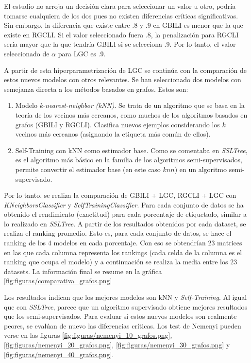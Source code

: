 El estudio no arroja un decisión clara  para seleccionar un valor u otro, podría tomarse cualquiera de los dos pues no existen diferencias críticas significativas. Sin embargo, la diferencia que existe entre .8 y .9 en GBILI es menor que la que existe en RGCLI. Si el valor seleccionado fuera .8, la penalización para RGCLI sería mayor que la que tendría GBILI si se selecciona .9. Por lo tanto, el valor seleccionado de $\alpha$ para LGC es .9.

A partir de esta hiperparametrización de LGC se continúa con la comparación de estos nuevos modelos con otros relevantes. Se han seleccionado dos modelos con semejanza directa a los métodos basados en grafos. Estos son:

\begin{enumerate}
    \item Modelo \textit{k-nearest-neighbor (kNN)}. Se trata de un algoritmo que se basa en la teoría de los vecinos más cercanos, como muchos de los algoritmos basados en grafos (GBILI y RGCLI). Clasifica nuevos ejemplos considerando los $k$ vecinos más cercanos (asignando la etiqueta más común de ellos).
    \item Self-Training con kNN como estimador base. Como se comentaba en \textit{SSLTree}, es el algoritmo más básico en la familia de los algoritmos semi-supervisados, permite convertir el estimador base (en este caso $knn$) en un algoritmo semi-supervisado.
\end{enumerate}

Por lo tanto, se realiza la comparación de GBILI + LGC, RGCLI + LGC con \textit{KNeighborsClassifier} y \textit{SelfTrainingClassifier}. Para cada conjunto de datos se ha obtenido el rendimiento (exactitud) para cada porcentaje de etiquetado, similar a lo realizado en \textit{SSLTree}. A partir de los resultados obtenidos por cada dataset, se realiza el ranking promedio. Esto es, para cada conjunto de datos, se hace el ranking de los 4 modelos en cada porcentaje. Con eso se obtendrían 23 matrices en las que cada columna representa los rankings (cada celda de la columna es el ranking que ocupa el modelo) y a continuación se realiza la media entre los 23 datasets. La información final se resume en la gráfica \ref{fig:figuras/comparativa_grafos.png}


Los resultados indican que los mejores modelos son kNN y \textit{Self-Training}. Al igual que con \textit{SSLTree}, parece que un algoritmo supervisado obtiene mejores resultados que los semi-supervisados. Para evaluar si estos nuevos modelos son realmente peores, se evalúan de nuevo las diferencias críticas. Los test de Nemenyi pueden verse en las figuras \ref{fig:figuras/nemenyi_10_grafos.png}, \ref{fig:figuras/nemenyi_20_grafos.png}, \ref{fig:figuras/nemenyi_30_grafos.png} y \ref{fig:figuras/nemenyi_40_grafos.png}.

